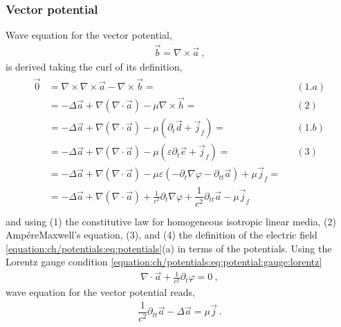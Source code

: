 \documentclass[letterpaper,10pt,english]{jupyterBook}
\begin{document}
\subsubsection{Vector potential}
\label{\detokenize{ch/waves-equation:vector-potential}}
\sphinxAtStartPar
Wave equation for the vector potential,
\begin{equation*}
\begin{split}\vec{b} = \nabla \times \vec{a} \ ,\end{split}
\end{equation*}
\sphinxAtStartPar
is derived taking the curl of its definition,
\begin{equation*}
\begin{split}\begin{aligned}
\vec{0} & = \nabla \times \nabla \times \vec{a} - \nabla \times \vec{b} = && (1.a) \\
 & = - \Delta \vec{a} + \nabla(\nabla \cdot \vec{a})  - \mu \nabla \times \vec{h} = && (2) \\
 & = - \Delta \vec{a} + \nabla(\nabla \cdot \vec{a})  - \mu ( \partial_t \vec{d} + \vec{j}_f )  = && (1.b) \\
 & = - \Delta \vec{a} + \nabla(\nabla \cdot \vec{a})  - \mu ( \varepsilon \partial_t \vec{e} + \vec{j}_f )  = && (3) \\
 & = - \Delta \vec{a} + \nabla(\nabla \cdot \vec{a})  - \mu \varepsilon ( - \partial_t \nabla \varphi - \partial_{tt} \vec{a} ) + \mu \vec{j}_f = \\
 & = - \Delta \vec{a} + \nabla(\nabla \cdot \vec{a})  + \frac{1}{c^2} \partial_t \nabla \varphi + \dfrac{1}{c^2} \partial_{tt} \vec{a} - \mu \vec{j}_f  \\
\end{aligned}\end{split}
\end{equation*}
\sphinxAtStartPar
and using (1) the constitutive law for homogeneous isotropic linear media, (2) Ampére\sphinxhyphen{}Maxwell’s equation, (3), and (4) the definition of the electric field \eqref{equation:ch/potentials:eq:potentials}(a)  in terms of the potentials. Using the Lorentz gauge condition \eqref{equation:ch/potentials:eq:potential:gauge:lorentz}
\begin{equation*}
\begin{split}\nabla \cdot \vec{a} + \frac{1}{c^2} \partial_t  \varphi = 0 \ ,\end{split}
\end{equation*}
\sphinxAtStartPar
wave equation for the vector potential reads,
\begin{equation}\label{equation:ch/waves-equation:eq:wave:a}
\begin{split} \dfrac{1}{c^2} \partial_{tt} \vec{a} - \Delta \vec{a}  =  \mu \vec{j}  \ .\end{split}
\end{equation}
\end{document}
